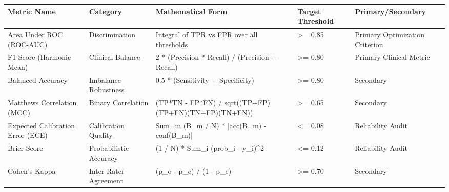 \begin{tabular}{lllll}
\toprule
Metric Name & Category & Mathematical Form & Target Threshold & Primary/Secondary \\
\midrule
Area Under ROC (ROC-AUC) & Discrimination & Integral of TPR vs FPR over all thresholds & >= 0.85 & Primary Optimization Criterion \\
F1-Score (Harmonic Mean) & Clinical Balance & 2 * (Precision * Recall) / (Precision + Recall) & >= 0.80 & Primary Clinical Metric \\
Balanced Accuracy & Imbalance Robustness & 0.5 * (Sensitivity + Specificity) & >= 0.80 & Secondary \\
Matthews Correlation (MCC) & Binary Correlation & (TP*TN - FP*FN) / sqrt((TP+FP)(TP+FN)(TN+FP)(TN+FN)) & >= 0.65 & Secondary \\
Expected Calibration Error (ECE) & Calibration Quality & Sum\_m (B\_m / N) * |acc(B\_m) - conf(B\_m)| & <= 0.08 & Reliability Audit \\
Brier Score & Probabilistic Accuracy & (1 / N) * Sum\_i (prob\_i - y\_i)\textasciicircum 2 & <= 0.12 & Reliability Audit \\
Cohen's Kappa & Inter-Rater Agreement & (p\_o - p\_e) / (1 - p\_e) & >= 0.70 & Secondary \\
\bottomrule
\end{tabular}
